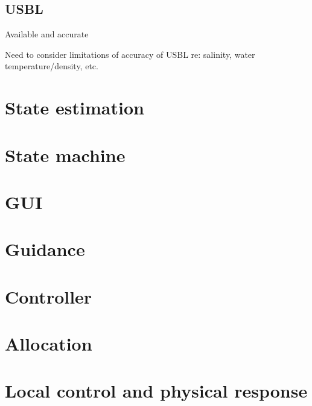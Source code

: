 \documentclass[class=article, crop=false, draft=true]{standalone}
\begin{document}
\subsection{USBL}
Available and accurate

Need to consider limitations of accuracy of USBL re: salinity, water temperature/density, etc.

\section{State estimation}

\section{State machine}

\section{GUI}

\section{Guidance}

\section{Controller}

\section{Allocation}

\section{Local control and physical response}
\end{document}
